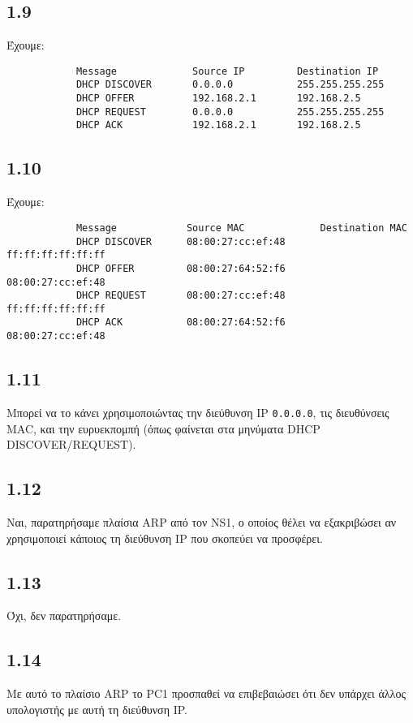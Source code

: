 \documentclass[a4paper, 12pt]{article}
\begin{document}
	\subsection*{1.9}
		Έχουμε:
	
		\begin{verbatim}
			Message             Source IP         Destination IP
			DHCP DISCOVER       0.0.0.0           255.255.255.255
			DHCP OFFER          192.168.2.1       192.168.2.5
			DHCP REQUEST        0.0.0.0           255.255.255.255
			DHCP ACK            192.168.2.1       192.168.2.5
		\end{verbatim}
	
	\subsection*{1.10}
		Έχουμε:
		
		\begin{verbatim}
			Message            Source MAC             Destination MAC
			DHCP DISCOVER      08:00:27:cc:ef:48      ff:ff:ff:ff:ff:ff
			DHCP OFFER         08:00:27:64:52:f6      08:00:27:cc:ef:48
			DHCP REQUEST       08:00:27:cc:ef:48      ff:ff:ff:ff:ff:ff
			DHCP ACK           08:00:27:64:52:f6      08:00:27:cc:ef:48
		\end{verbatim}
	
	\subsection*{1.11}
		Μπορεί να το κάνει χρησιμοποιώντας την διεύθυνση IP \verb|0.0.0.0|, τις διευθύνσεις MAC, και την ευρυεκπομπή (όπως φαίνεται στα μηνύματα DHCP DISCOVER/REQUEST).
	
	\subsection*{1.12}
		Ναι, παρατηρήσαμε πλαίσια ARP από τον NS1, ο οποίος θέλει να εξακριβώσει αν χρησιμοποιεί κάποιος τη διεύθυνση IP που σκοπεύει να προσφέρει.
	
	\subsection*{1.13}
		Όχι, δεν παρατηρήσαμε.
	
	\subsection*{1.14}
		Με αυτό το πλαίσιο ARP το PC1 προσπαθεί να επιβεβαιώσει ότι δεν υπάρχει άλλος υπολογιστής με αυτή τη διεύθυνση IP.
	
\end{document}
